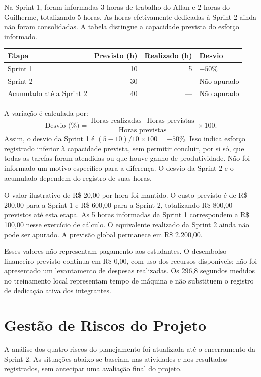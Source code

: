 \documentclass[12pt,a4paper]{article}
\begin{document}
Na Sprint 1, foram informadas 3 horas de trabalho do Allan e 2 horas do Guilherme, totalizando 5 horas. As horas efetivamente dedicadas à Sprint 2 ainda não foram consolidadas. A tabela distingue a capacidade prevista do esforço informado.

\begin{center}
\small
\begin{tabularx}{\textwidth}{@{}YrrY@{}}
\toprule
\textbf{Etapa} & \textbf{Previsto (h)} & \textbf{Realizado (h)} & \textbf{Desvio} \\
\midrule
Sprint 1 & 10 & 5 & $-50\%$ \\
Sprint 2 & 30 & --- & Não apurado \\
\midrule
Acumulado até a Sprint 2 & 40 & --- & Não apurado \\
\bottomrule
\end{tabularx}
\end{center}

A variação é calculada por:
\[
\text{Desvio (\%)} =
\frac{\text{Horas realizadas} - \text{Horas previstas}}
     {\text{Horas previstas}} \times 100.
\]
Assim, o desvio da Sprint 1 é $(5-10)/10\times100=-50\%$. Isso indica esforço registrado inferior à capacidade prevista, sem permitir concluir, por si só, que todas as tarefas foram atendidas ou que houve ganho de produtividade. Não foi informado um motivo específico para a diferença. O desvio da Sprint 2 e o acumulado dependem do registro de suas horas.

O valor ilustrativo de R\$ 20,00 por hora foi mantido. O custo previsto é de R\$ 200,00 para a Sprint 1 e R\$ 600,00 para a Sprint 2, totalizando R\$ 800,00 previstos até esta etapa. As 5 horas informadas da Sprint 1 correspondem a R\$ 100,00 nesse exercício de cálculo. O equivalente realizado da Sprint 2 ainda não pode ser apurado. A previsão global permanece em R\$ 2.200,00.

Esses valores não representam pagamento aos estudantes. O desembolso financeiro previsto continua em R\$ 0,00, com uso dos recursos disponíveis; não foi apresentado um levantamento de despesas realizadas. Os 296,8 segundos medidos no treinamento local representam tempo de máquina e não substituem o registro de dedicação ativa dos integrantes.

\section{Gestão de Riscos do Projeto}
A análise dos quatro riscos do planejamento foi atualizada até o encerramento da Sprint 2. As situações abaixo se baseiam nas atividades e nos resultados registrados, sem antecipar uma avaliação final do projeto.
\end{document}
